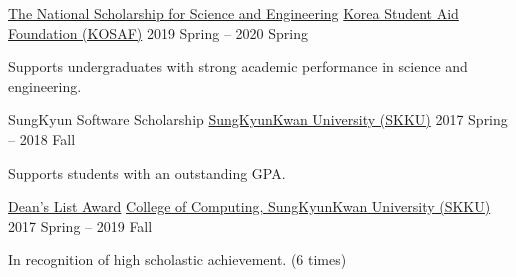 \documentclass[11pt, a4paper]{cv}
\begin{document}
\begin{cventries}

  \cvhonor
    {\href{https://www.kosaf.go.kr/eng/jsp/aid/aid02_01_01.jsp}{The National Scholarship for Science and Engineering}} %
    {\href{https://www.kosaf.go.kr/eng/jsp/main.jsp}{Korea Student Aid Foundation (KOSAF)}} %
    {2019 Spring -- 2020 Spring} %
    {
      \begin{cvitems} %
        \item {Supports undergraduates with strong academic performance in science and engineering.}
      \end{cvitems}
    }

  \cvhonor
    {SungKyun Software Scholarship} %
    {\href{https://www.skku.edu/eng/}{SungKyunKwan University (SKKU)}} %
    {2017 Spring -- 2018 Fall} %
    {
      \begin{cvitems} %
        \item {Supports students with an outstanding GPA.}
      \end{cvitems}
    }

  \cvhonor
    {\href{https://cs.skku.edu/en/edures/education/view/4137}{Dean's List Award}} %
    {\href{https://cs.skku.edu/en}{College of Computing, SungKyunKwan University (SKKU)}} %
    {2017 Spring -- 2019 Fall} %
    {
      \begin{cvitems} %
        \item {In recognition of high scholastic achievement. (6 times)}
      \end{cvitems}
    }

\end{cventries}

\clearpage
\end{document}
